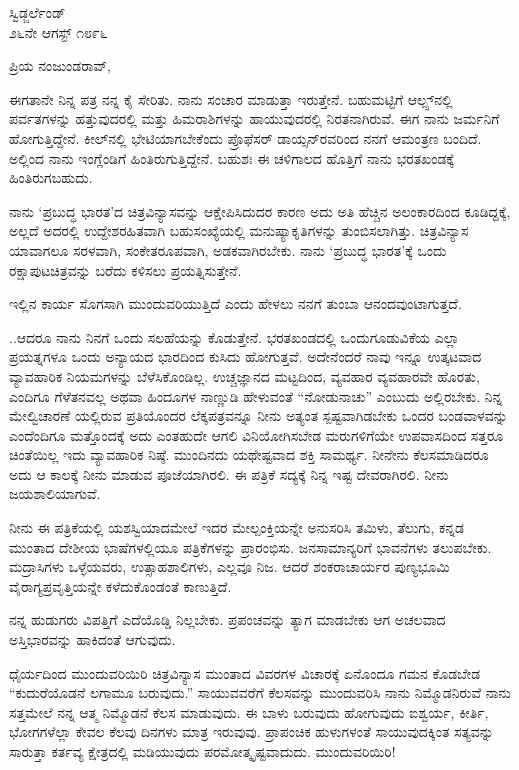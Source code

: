 \begin{flushright}
ಸ್ವಿಡ್ಜರ್ಲೆಂಡ್\\೨೬ನೇ ಆಗಸ್ಟ್ ೧೮೯೬
\end{flushright}

\noindent
ಪ್ರಿಯ ನಂಜುಂಡರಾವ್,

ಈಗತಾನೇ ನಿನ್ನ ಪತ್ರ ನನ್ನ ಕೈ ಸೇರಿತು. ನಾನು ಸಂಚಾರ ಮಾಡುತ್ತಾ ಇರುತ್ತೇನೆ. ಬಹುಮಟ್ಟಿಗೆ ಆಲ್ಪ್ಸ್‌ನಲ್ಲಿ ಪರ್ವತಗಳನ್ನು ಹತ್ತುವುದರಲ್ಲಿ ಮತ್ತು ಹಿಮರಾಶಿಗಳನ್ನು ಹಾಯುವುದರಲ್ಲಿ ನಿರತನಾಗಿರುವೆ. ಈಗ ನಾನು ಜರ್ಮನಿಗೆ ಹೋಗುತ್ತಿದ್ದೇನೆ. ಕೀಲ್‌ನಲ್ಲಿ ಭೇಟಿಯಾಗಬೇಕೆಂದು ಪ್ರೊಫೆಸರ್ ಡಾಯ್ಸನ್‌ರವರಿಂದ ನನಗೆ ಆಮಂತ್ರಣ ಬಂದಿದೆ. ಅಲ್ಲಿಂದ ನಾನು ಇಂಗ್ಲೆಂಡಿಗೆ ಹಿಂತಿರುಗುತ್ತಿದ್ದೇನೆ. ಬಹುಶಃ ಈ ಚಳಿಗಾಲದ ಹೊತ್ತಿಗೆ ನಾನು ಭರತಖಂಡಕ್ಕೆ ಹಿಂತಿರುಗಬಹುದು.

ನಾನು ‘ಪ್ರಬುದ್ಧ ಭಾರತ’ದ ಚಿತ್ರವಿನ್ಯಾಸವನ್ನು ಆಕ್ಷೇಪಿಸಿದುದರ ಕಾರಣ ಅದು ಅತಿ ಹೆಚ್ಚಿನ ಅಲಂಕಾರದಿಂದ ಕೂಡಿದ್ದಕ್ಕೆ, ಅಲ್ಲದೆ ಅದರಲ್ಲಿ ಉದ್ದೇಶರಹಿತವಾಗಿ ಬಹುಸಂಖ್ಯೆಯಲ್ಲಿ ಮನುಷ್ಯಾಕೃತಿಗಳನ್ನು ತುಂಬಿಸಲಾಗಿತ್ತು. ಚಿತ್ರವಿನ್ಯಾಸ ಯಾವಾಗಲೂ ಸರಳವಾಗಿ, ಸಂಕೇತರೂಪವಾಗಿ, ಅಡಕವಾಗಿರಬೇಕು. ನಾನು ‘ಪ್ರಬುದ್ಧ ಭಾರತ’ಕ್ಕೆ ಒಂದು ರಕ್ಷಾಪುಟಚಿತ್ರವನ್ನು ಬರೆದು ಕಳಿಸಲು ಪ್ರಯತ್ನಿಸುತ್ತೇನೆ.

ಇಲ್ಲಿನ ಕಾರ್ಯ ಸೊಗಸಾಗಿ ಮುಂದುವರಿಯುತ್ತಿದೆ ಎಂದು ಹೇಳಲು ನನಗೆ ತುಂಬಾ ಆನಂದವುಂಟಾಗುತ್ತದೆ.

..ಆದರೂ ನಾನು ನಿನಗೆ ಒಂದು ಸಲಹೆಯನ್ನು ಕೊಡುತ್ತೇನೆ. ಭರತಖಂಡದಲ್ಲಿ ಒಂದುಗೂಡುವಿಕೆಯ ಎಲ್ಲಾ ಪ್ರಯತ್ನಗಳೂ ಒಂದು ಅನ್ಯಾಯದ ಭಾರದಿಂದ ಕುಸಿದು ಹೋಗುತ್ತವೆ. ಅದೇನೆಂದರೆ ನಾವು ಇನ್ನೂ ಉತ್ಕಟವಾದ ವ್ಯಾವಹಾರಿಕ ನಿಯಮಗಳನ್ನು ಬೆಳೆಸಿಕೊಂಡಿಲ್ಲ. ಉಚ್ಚಜ್ಞಾನದ ಮಟ್ಟದಿಂದ, ವ್ಯವಹಾರ ವ್ಯವಹಾರವೇ ಹೊರತು, ಎಂದಿಗೂ ಗೆಳೆತನವಲ್ಲ\enginline{-} ಅಥವಾ ಹಿಂದೂಗಳ ನಾಣ್ಣುಡಿ ಹೇಳುವಂತೆ “ನೋಡು\enginline{-}ನಾಚು” ಎಂಬುದು ಅಲ್ಲಿರಬೇಕು. ನಿನ್ನ ಮೇಲ್ವಿಚಾರಣೆ ಯಲ್ಲಿರುವ ಪ್ರತಿಯೊಂದರ ಲೆಕ್ಕಪತ್ರವನ್ನೂ ನೀನು ಅತ್ಯಂತ ಸ್ಪಷ್ಟವಾಗಿಡಬೇಕು\enginline{-} ಒಂದರ ಬಂಡವಾಳವನ್ನು ಎಂದೆಂದಿಗೂ ಮತ್ತೊಂದಕ್ಕೆ ಅದು ಎಂತಹುದೇ ಆಗಲಿ ವಿನಿಯೋಗಿಸಬೇಡ \enginline{-} ಮರುಗಳಿಗೆಯೇ ಉಪವಾಸದಿಂದ ಸತ್ತರೂ ಚಿಂತೆಯಿಲ್ಲ\enginline{-} ಇದು ವ್ಯಾವಹಾರಿಕ ನಿಷ್ಠೆ. ಮುಂದಿನದು ಯಥೇಷ್ಟವಾದ ಶಕ್ತಿ ಸಾಮರ್ಥ್ಯ. ನೀನೇನು ಕೆಲಸಮಾಡಿದರೂ ಅದು ಆ ಕಾಲಕ್ಕೆ ನೀನು ಮಾಡುವ ಪೂಜೆಯಾಗಿರಲಿ. ಈ ಪತ್ರಿಕೆ ಸದ್ಯಕ್ಕೆ ನಿನ್ನ ಇಷ್ಟ ದೇವರಾಗಿರಲಿ. ನೀನು ಜಯಶಾಲಿಯಾಗುವೆ.

ನೀನು ಈ ಪತ್ರಿಕೆಯಲ್ಲಿ ಯಶಸ್ವಿಯಾದಮೇಲೆ ಇದರ ಮೇಲ್ಪಂಕ್ತಿಯನ್ನೇ ಅನುಸರಿಸಿ ತಮಿಳು, ತೆಲುಗು, ಕನ್ನಡ ಮುಂತಾದ ದೇಶೀಯ ಭಾಷೆಗಳಲ್ಲಿಯೂ ಪತ್ರಿಕೆಗಳನ್ನು ಪ್ರಾರಂಭಿಸು. ಜನಸಾಮಾನ್ಯರಿಗೆ ಭಾವನೆಗಳು ತಲುಪಬೇಕು. ಮದ್ರಾಸಿಗಳು ಒಳ್ಳೆಯವರು, ಉತ್ಸಾಹಶಾಲಿಗಳು, ಎಲ್ಲವೂ ನಿಜ. ಆದರೆ ಶಂಕರಾಚಾರ್ಯರ ಪುಣ್ಯಭೂಮಿ ವೈರಾಗ್ಯಪ್ರವೃತ್ತಿಯನ್ನೇ ಕಳೆದುಕೊಂಡಂತೆ ಕಾಣುತ್ತಿದೆ.

ನನ್ನ ಹುಡುಗರು ವಿಪತ್ತಿಗೆ ಎದೆಯೊಡ್ಡಿ ನಿಲ್ಲಬೇಕು. ಪ್ರಪಂಚವನ್ನು ತ್ಯಾಗ ಮಾಡಬೇಕು\enginline{-} ಆಗ ಅಚಲವಾದ ಅಸ್ತಿಭಾರವನ್ನು ಹಾಕಿದಂತೆ ಆಗುವುದು.

ಧೈರ್ಯದಿಂದ ಮುಂದುವರಿಯಿರಿ\enginline{-} ಚಿತ್ರವಿನ್ಯಾಸ ಮುಂತಾದ ವಿವರಗಳ ವಿಚಾರಕ್ಕೆ ಏನೊಂದೂ ಗಮನ ಕೊಡಬೇಡ\enginline{-} “ಕುದುರೆಯೊಡನೆ ಲಗಾಮೂ ಬರುವುದು.” ಸಾಯುವವರೆಗೆ ಕೆಲಸವನ್ನು ಮುಂದುವರಿಸಿ\enginline{-} ನಾನು ನಿಮ್ಮೊಡನಿರುವೆ\enginline{-} ನಾನು ಸತ್ತಮೇಲೆ ನನ್ನ ಆತ್ಮ ನಿಮ್ಮೊಡನೆ ಕೆಲಸ ಮಾಡುವುದು. ಈ ಬಾಳು ಬರುವುದು ಹೋಗುವುದು\enginline{-} ಐಶ್ವರ್ಯ, ಕೀರ್ತಿ, ಭೋಗಗಳೆಲ್ಲಾ ಕೇವಲ ಕೆಲವು ದಿನಗಳು ಮಾತ್ರ ಇರುವುವು. ಪ್ರಾಪಂಚಿಕ ಹುಳುಗಳಂತೆ ಸಾಯುವುದಕ್ಕಿಂತ ಸತ್ಯವನ್ನು ಸಾರುತ್ತಾ ಕರ್ತವ್ಯ ಕ್ಷೇತ್ರದಲ್ಲಿ ಮಡಿಯುವುದು ಪರಮೋತ್ಕೃಷ್ಟವಾದುದು. ಮುಂದುವರಿಯಿರಿ!

